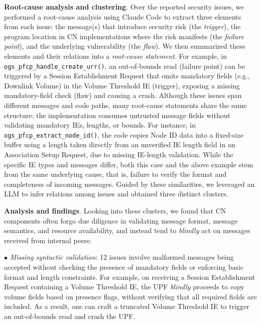 \vspace{2pt}\noindent\textbf{Root-cause analysis and clustering}. Over the reported security issues, we performed a root-cause analysis using Claude Code to extract three elements from each issue: the message(s) that introduce security risk (the \textit{trigger}), the program location in CN implementations where the risk manifests (the \textit{failure point}), and the underlying vulnerability (the \textit{flaw}). We then summarized these elements and their relations into a \textit{root-cause statement}. For example, in \texttt{ogs\_pfcp\_handle\_create\_urr()}, an out-of-bounds read (failure point) can be triggered by a Session Establishment Request that omits mandatory fields (e.g., Downlink Volume) in the Volume Threshold IE (trigger), exposing a missing mandatory-field check (flaw) and causing a crash.
Although these issues span different messages and code paths, many root-cause statements share the same structure: the implementation consumes untrusted message fields without validating mandatory IEs, lengths, or bounds. For instance, in \texttt{ogs\_pfcp\_extract\_node\_id()}, the code copies Node ID data into a fixed-size buffer using a length taken directly from an unverified IE length field in an Association Setup Request, due to missing IE-length validation. While the specific IE types and messages differ, both this case and the above example stem from the same underlying cause, that is, failure to verify the format and completeness of incoming messages. Guided by these similarities, we leveraged an LLM to infer relations among issues and obtained three distinct clusters. 


\vspace{2pt}\noindent\textbf{Analysis and findings}.
Looking into these clusters, we found that CN components often forgo due diligence in validating message format, message semantics, and resource availability, and instead tend to \textit{blindly} act on messages received from internal peers: 

\vspace{2pt}\noindent$\bullet$ \textit{Missing syntactic validation}: 12 issues involve malformed messages being accepted without checking the presence of mandatory fields or enforcing basic format and length constraints. For example, on receiving a Session Establishment Request containing a Volume Threshold IE, the UPF \textit{blindly} proceeds to copy volume fields based on presence flags, without verifying that all required fields are included. As a result, one can craft a truncated Volume Threshold IE to trigger an out-of-bounds read and crash the UPF.


